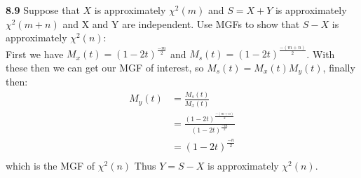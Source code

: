 
{\bf 8.9}
Suppose that $X$ is approximately $\chi^{2}(m)$ and $S = X+Y$ is approximately $ \chi^{2}(m + n)$
and X and Y are independent. Use MGFs to show that $S-X$ is approximately $\chi^{2}(n)$:\\

First we have $M_{x}(t) = (1-2t)^{\frac{-m}{2}}$ and $M_{s}(t) = (1-2t)^{\frac{-(m+n)}{2}}$.
With these then we can get our MGF of interest, so $M_{s}(t) = M_{x}(t)M_{y}(t)$, finally then: \\
\begin{align*}
	M_{y}(t) & = \frac{M_{s}(t)}{M_{x}(t)} \\ 
	& = \frac{(1-2t)^{\frac{-(m+n)}{2}}}{(1-2t)^{\frac{-m}{2}}} \\
	& = (1-2t)^{\frac{-n}{2}} \\
\end{align*}
which is the MGF of $\chi^{2}(n)$ 
Thus $ Y=S-X $ is approximately $\chi^{2}(n)$.\\


